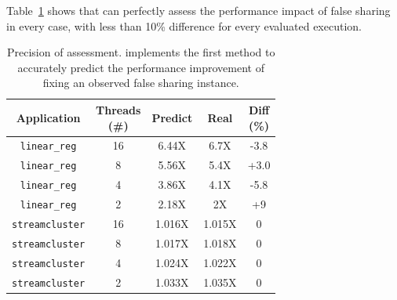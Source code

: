 Table~\ref{tbl: precision} shows that \cheetah{} can perfectly assess the performance impact of false sharing in every case, with less than 10\% difference for every evaluated execution. %

\begin{table}
  \small
  \centering
  \begin{tabular}{ c | c | c | c | c}
  \hline
  \textbf{Application} & \specialcell{Threads \\ (\#)} & \textbf{Predict} & \textbf{Real} & \specialcell{Diff \\ (\%)}\\ \hline
\texttt{linear\_reg} & 16 & 6.44X    & 6.7X & {-3.8}\\
\texttt{linear\_reg}& 8  & 5.56X    & 5.4X & {+3.0}\\
\texttt{linear\_reg} & 4  & 3.86X  & 4.1X  & {-5.8}\\
 \texttt{linear\_reg}& 2  & 2.18X  & 2X    & {+9}\\ \hline
 \texttt{streamcluster} & 16 & 1.016X    & 1.015X &  {0}\\
 \texttt{streamcluster} & 8 & 1.017X    & 1.018X & {0}\\
 \texttt{streamcluster} & 4 & 1.024X    & 1.022X & {0}\\
 \texttt{streamcluster} & 2 & 1.033X    & 1.035X & {0}
\end{tabular}
  \caption{
    Precision of assessment. \Cheetah{} implements the first method to accurately predict the performance improvement of fixing an observed false sharing instance. \label{tbl: precision}}
\end{table}

